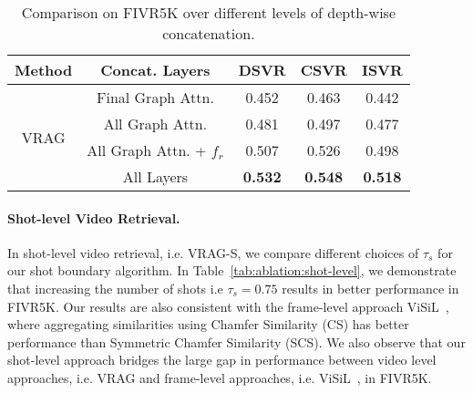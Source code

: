 \documentclass[letterpaper]{article} \usepackage{aaai22}  \usepackage{times}  \usepackage{helvet}  \usepackage{courier}  \usepackage[hyphens]{url}  \usepackage{graphicx} \urlstyle{rm} \usepackage{amsmath}
\begin{document}
\begin{table}[ht]
    \centering
    \begin{tabular}{|c|c|c|c|c|}
    \hline
         Method & Concat. Layers & DSVR & CSVR & ISVR \\
         \hline\hline
         \multirow{4}{*}{VRAG} & Final Graph Attn. & 0.452 & 0.463 & 0.442 \\
        \cline{2-5}
         & All Graph Attn. & 0.481 & 0.497 & 0.477 \\
        \cline{2-5}
         & All Graph Attn. + $f_r$ & 0.507 & 0.526 & 0.498 \\
        \cline{2-5}
         &  All Layers & \textbf{0.532} & \textbf{0.548} & \textbf{0.518} \\
         \hline
    \end{tabular}
    \caption{Comparison on FIVR5K over different levels of depth-wise concatenation.}
    \label{tab:ablation:region-embed}
\end{table}

\paragraph{Shot-level Video Retrieval.}
In shot-level video retrieval, i.e. VRAG-S, we compare different choices of $\tau_s$ for our shot boundary algorithm. In Table~\ref{tab:ablation:shot-level}, we demonstrate that increasing the number of shots i.e $\tau_s = 0.75$ results in better performance in FIVR5K. Our results are also consistent with the frame-level approach ViSiL~\cite{kordopatiszilos2019visil}, where aggregating similarities using Chamfer Similarity (CS) has better performance than Symmetric Chamfer Similarity (SCS). We also observe that our shot-level approach bridges the large gap in performance between video level approaches, i.e. VRAG and frame-level approaches, i.e. ViSiL~\cite{kordopatiszilos2019visil}, in FIVR5K.
\end{document}

